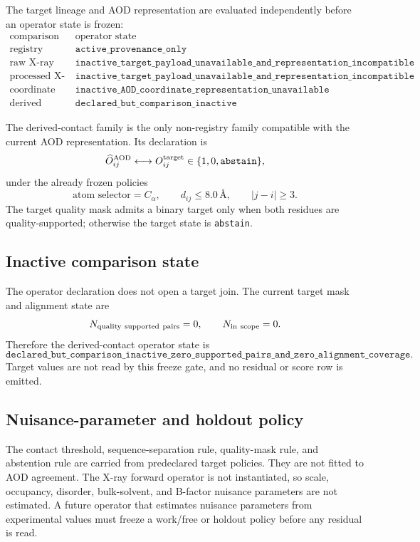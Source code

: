 The target lineage and AOD representation are evaluated independently before an operator state is frozen:
\[
\begin{array}{c|c}
\text{comparison space} & \text{operator state}\\ \hline
\text{registry} & \texttt{active\_provenance\_only}\\
\text{raw X-ray measurement} & \texttt{inactive\_target\_payload\_unavailable\_and\_representation\_incompatible}\\
\text{processed X-ray measurement} & \texttt{inactive\_target\_payload\_unavailable\_and\_representation\_incompatible}\\
\text{coordinate model} & \texttt{inactive\_AOD\_coordinate\_representation\_unavailable}\\
\text{derived contact} & \texttt{declared\_but\_comparison\_inactive}
\end{array}
\]

The derived-contact family is the only non-registry family compatible with the current AOD representation.  Its declaration is
\[
\widehat O^{\rm AOD}_{ij}
\longleftrightarrow
O^{\rm target}_{ij}
\in\{1,0,\texttt{abstain}\},
\]
under the already frozen policies
\[
\text{atom selector}=C_\alpha,\qquad
 d_{ij}\le 8.0\,\text{\AA},\qquad
 |j-i|\ge 3.
\]
The target quality mask admits a binary target only when both residues are quality-supported; otherwise the target state is \texttt{abstain}.

\subsection{Inactive comparison state}

The operator declaration does not open a target join.  The current target mask and alignment state are
\[
N_{\rm quality\ supported\ pairs}=0,
\qquad
N_{\rm in\ scope}=0.
\]
Therefore the derived-contact operator state is
\[
\texttt{declared\_but\_comparison\_inactive\_zero\_supported\_pairs\_and\_zero\_alignment\_coverage}.
\]
Target values are not read by this freeze gate, and no residual or score row is emitted.

\subsection{Nuisance-parameter and holdout policy}

The contact threshold, sequence-separation rule, quality-mask rule, and abstention rule are carried from predeclared target policies.  They are not fitted to AOD agreement.  The X-ray forward operator is not instantiated, so scale, occupancy, disorder, bulk-solvent, and B-factor nuisance parameters are not estimated.  A future operator that estimates nuisance parameters from experimental values must freeze a work/free or holdout policy before any residual is read.

